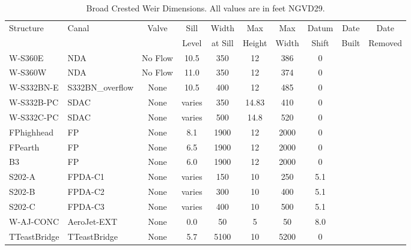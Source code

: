 \begin{table}[!h]
\caption[Broad Crested Weir Dimensions.]{Broad Crested Weir Dimensions. All values are in feet NGVD29.}
\label{tab:weirs}
\begin{tabular}{llcccccccc}
\hline
Structure         & Canal            & Valve     & Sill    & Width   & Max   & Max   & Datum & Date      & Date       \\
                  &                  &           & Level   & at Sill & Height& Width & Shift & Built     & Removed    \\
\hline
W-S360E           & NDA              & No Flow   &  10.5   & 350     & 12    & 386   & 0     &           &            \\
W-S360W           & NDA              & No Flow   &  11.0   & 350     & 12    & 374   & 0     &           &            \\
W-S332BN-E        & S332BN\_overflow & None      &  10.5   & 400     & 12    & 485   & 0     &           &            \\
W-S332B-PC        & SDAC             & None      &  varies & 350     & 14.83 & 410   & 0     &           &            \\
W-S332C-PC        & SDAC             & None      &  varies & 500     & 14.8  & 520   & 0     &           &            \\
FPhighhead        & FP               & None      &  8.1    & 1900    & 12    & 2000  & 0     &           &            \\
FPearth           & FP               & None      &  6.5    & 1900    & 12    & 2000  & 0     &           &            \\
B3                & FP               & None      &  6.0    & 1900    & 12    & 2000  & 0     &           &            \\
S202-A            & FPDA-C1          & None      &  varies & 150     & 10    & 250   & 5.1   &           &            \\
S202-B            & FPDA-C2          & None      &  varies & 300     & 10    & 400   & 5.1   &           &            \\
S202-C            & FPDA-C3          & None      &  varies & 400     & 10    & 500   & 5.1   &           &            \\
W-AJ-CONC         & AeroJet-EXT      & None      &  0.0    & 50      & 5     & 50    & 8.0   &           &            \\
TTeastBridge      & TTeastBridge     & None      &  5.7    & 5100    & 10    & 5200  & 0     &           &            \\

\end{tabular}
\end{table}
